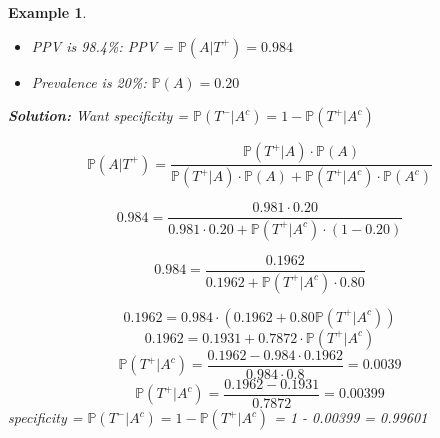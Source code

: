 \documentclass[12pt]{amsart}
\newtheorem{example}[theorem]{Example}
\begin{document}
{\begin{example}
\begin{itemize}
\vspace{0.5cm}
	\item PPV is 98.4\%: \newline 
	PPV = $\mathbb{P}(A|T^+) = 0.984$ 
	
\vspace{0.5cm}
	\item Prevalence is 20\%:\newline 
	$\mathbb{P}(A) = 0.20$ 

\end{itemize}

\vspace{0.5cm}
\textbf{Solution:} %
Want specificity  = $\mathbb{P}(T^-|A^c) = 1 - \mathbb{P}(T^+|A^c)$

\vspace{0.5cm}
$$
\mathbb{P}(A | T^+) = 
\frac{\mathbb{P}(T^+|A) \cdot \mathbb{P}(A)}
{\mathbb{P}(T^+|A) \cdot \mathbb{P}(A) + \mathbb{P}(T^+|A^c) \cdot \mathbb{P}(A^c) }
$$

$$
0.984 = 
\frac{0.981 \cdot  0.20}
{0.981 \cdot  0.20 + \mathbb{P}(T^+|A^c) \cdot (1- 0.20) }
$$

$$
0.984 = 
\frac{0.1962}
{0.1962 + \mathbb{P}(T^+|A^c) \cdot 0.80 }
$$

$$
0.1962 = 0.984 \cdot(0.1962 + 0.80\mathbb{P}(T^+|A^c))
$$
$$
0.1962 = 0.1931 + 0.7872\cdot\mathbb{P}(T^+|A^c) 
$$
$$
\mathbb{P}(T^+|A^c)  = \frac{0.1962 - 0.984\cdot 0.1962}{  0.984\cdot 0.8} = 0.0039
$$
$$
\mathbb{P}(T^+|A^c)  = \frac{0.1962 - 0.1931}{  0.7872} = 0.00399
$$
specificity  = $\mathbb{P}(T^-|A^c) = 1 - \mathbb{P}(T^+|A^c)$ = 1 - 0.00399 = 0.99601

\end{example}
}  %
\end{document}
